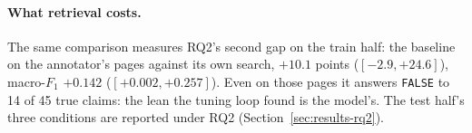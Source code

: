 \paragraph{What retrieval costs.} The same comparison measures RQ2's
second gap on the train half: the baseline on the annotator's pages
against its own search, $+10.1$ points ($[-2.9, +24.6]$), macro-$F_1$
$+0.142$ ($[+0.002, +0.257]$). Even on those pages it answers
\texttt{FALSE} to 14 of 45 true claims: the lean the tuning loop found
is the model's. The test half's three conditions are reported under
RQ2 (Section~\ref{sec:results-rq2}).

